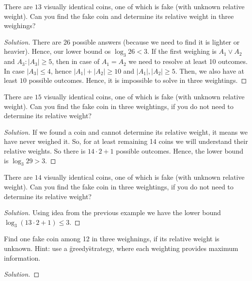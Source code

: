 \begin{example}
    There are $13$ visually identical coins, one of which is fake (with unknown relative weight).
    Can you find the fake coin and determine its relative weight in three weighings?
\end{example}
\begin{proof}[Solution]
    There are 26 possible answers (because we need to find it is lighter or heavier).
    Hence, our lower bound os $\log_3 26 < 3$.
    If the first weighing is $A_1 \lor A_2$ and $A_3 \colon |A_3| \geq 5$, then in case of $A_1 = A_2$ we need to resolve at least 10 outcomes.
    In case $|A_3| \leq 4$, hence $|A_1| + |A_2| \geq 10$ and $|A_1|, |A_2| \geq 5$.
    Then, we also have at least $10$ possible outcomes.
    Hence, it is impossible to solve in three weightings.
\end{proof}

\begin{example}
    There are $15$ visually identical coins, one of which is fake (with unknown relative weight).
    Can you find the fake coin  in three weightings, if you do not need to determine its relative weight?
\end{example}
\begin{proof}[Solution]
    If we found a coin and cannot determine its relative weight, it means we have never weighed it.
    So, for at least remaining 14 coins we will understand their relative weights.
    So there is $14 \cdot 2 + 1$ possible outcomes.
    Hence, the lower bound is $\log_3 29 > 3$.
\end{proof}

\begin{example}
    There are $14$ visually identical coins, one of which is fake (with unknown relative weight).
    Can you find the fake coin  in three weightings, if you do not need to determine its relative weight?
\end{example}
\begin{proof}[Solution]
    Using idea from the previous example we have the lower bound $\log_3 (13 \cdot 2 + 1) \leq 3$.
    \hw
\end{proof}
\begin{example}
    Find one fake coin among 12 in three weighnings, if its relative weight is unknown.
    Hint: use a \"greedy\" strategy, where each weighting provides maximum information.
\end{example}
\begin{proof}[Solution]
\hw
\end{proof}

